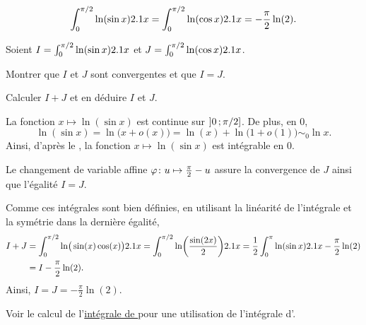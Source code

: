 \begin{marginfigure}[0cm]
    
\end{marginfigure}


\begin{prop}
\[
\int_0^{\pi/2} \ln(\sin x) \d x
= \int_0^{\pi/2} \ln(\cos x) \d x
= -\frac{\pi}{2} \ln(2).
\]
\end{prop}

\begin{exercice}\label{exercice:integraleEuler}
    Soient $I = \int_0^{\pi/2} \ln(\sin x) \d x$ et $J = \int_0^{\pi/2} \ln(\cos x) \d x$.
    \begin{questions}
        \item Montrer que $I$ et $J$ sont convergentes et que $I = J$.
        \item Calculer $I + J$ et en déduire $I$ et $J$.
    \end{questions}
\end{exercice}


\begin{elemsolution}
\begin{reponses}
\item La fonction $x \mapsto \ln(\sin x)$ est continue sur $\interof{0}{\pi/2}$. De plus, en $0$,
\[
\ln(\sin x) = \ln\mathopen{}\big(x + o(x)\big) = \ln(x) + \ln\mathopen{}\big(1 + o(1)\big) \sim_0 \ln x.
\]
Ainsi, d'après le , la fonction $x \mapsto \ln(\sin x)$ est intégrable en $0$.

Le changement de variable affine $\fonctionligne[\varphi]{u}{\frac{\pi}{2} - u}$ assure la convergence de $J$ ainsi que l'égalité $I = J$.

\item Comme ces intégrales sont bien définies, en utilisant la linéarité de l'intégrale et la symétrie dans la dernière égalité,
\begin{align*}
I + J &= \int_0^{\pi/2} \ln\mathopen{}\big( \sin(x) \cos(x) \big) \d x = \int_0^{\pi/2} \ln(\frac{\sin(2x)}{2}) \d x = \frac{1}{2} \int_0^\pi \ln(\sin x) \d x - \frac{\pi}{2} \ln(2) \\
&= I - \frac{\pi}{2} \ln(2).
\end{align*}
Ainsi, $I = J = -\frac{\pi}{2} \ln(2)$.
\end{reponses}
\end{elemsolution}
Voir le calcul de l'\hyperref[exercice:integralePoisson]{intégrale de } pour une utilisation de l'intégrale d'.

